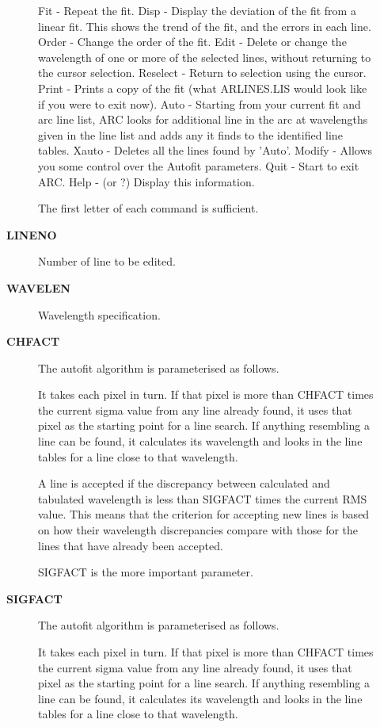 \begin{description}
\begin{description}
   Fit      - Repeat the fit.
   Disp     - Display the deviation of the fit from a linear fit.
              This shows the trend of the fit, and the errors in
              each line.
   Order    - Change the order of the fit.
   Edit     - Delete or change the wavelength of one or more of
              the selected lines, without returning to the cursor
              selection.
   Reselect - Return to selection using the cursor.
   Print    - Prints a copy of the fit (what ARLINES.LIS would look
              like if you were to exit now).
   Auto     - Starting from your current fit and arc line list, ARC
              looks for additional line in the arc at wavelengths
              given in the line list and adds any it finds to the
              identified line tables.
   Xauto    - Deletes all the lines found by 'Auto'.
   Modify   - Allows you some control over the Autofit parameters.
   Quit     - Start to exit ARC.
   Help     - (or ?) Display this information.

 The first letter of each command is sufficient.
\item [{\bf LINENO}]
 Number of line to be edited.
\item [{\bf WAVELEN}]
 Wavelength specification.
\item [{\bf CHFACT}]
 The autofit algorithm is parameterised as follows.

 It takes each pixel in turn.  If that pixel is more than CHFACT
 times the current sigma value from any line already found, it uses
 that pixel as the starting point for a line search.  If anything
 resembling a line can be found, it calculates its wavelength and
 looks in the line tables for a line close to that wavelength.

 A line is accepted if the discrepancy between calculated and
 tabulated wavelength is less than SIGFACT times the current RMS
 value.  This means that the criterion for accepting new lines
 is based on how their wavelength discrepancies compare with those for
 the lines that have already been accepted.

 SIGFACT is the more important parameter.
\item [{\bf SIGFACT}]
 The autofit algorithm is parameterised as follows.

 It takes each pixel in turn.  If that pixel is more than CHFACT
 times the current sigma value from any line already found, it uses
 that pixel as the starting point for a line search.  If anything
 resembling a line can be found, it calculates its wavelength and
 looks in the line tables for a line close to that wavelength.


\end{description}
\end{description}
